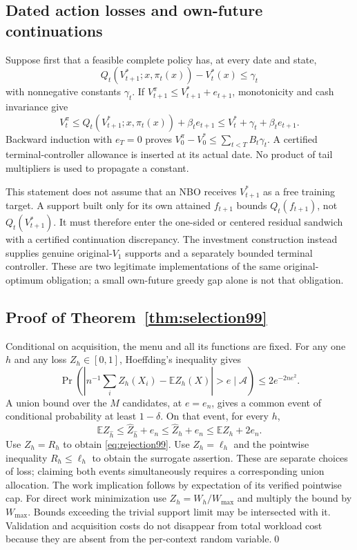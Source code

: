 \subsection{Dated action losses and own-future continuations}
Suppose first that a feasible complete policy has, at every date and state,
\[
 Q_t(V^*_{t+1};x,\pi_t(x))-V_t^*(x)\le\gamma_t
\]
with nonnegative constants $\gamma_t$. If $V^\pi_{t+1}\le V^*_{t+1}+e_{t+1}$, monotonicity and cash invariance give
\[
 V_t^\pi\le Q_t(V^*_{t+1};x,\pi_t(x))+\beta_te_{t+1}
 \le V_t^*+\gamma_t+\beta_te_{t+1}.
\]
Backward induction with $e_T=0$ proves $V_0^\pi-V_0^*\le\sum_{t<T}B_t\gamma_t$. A certified terminal-controller allowance is inserted at its actual date. No product of tail multipliers is used to propagate a constant.

This statement does not assume that an NBO receives $V^*_{t+1}$ as a free training target. A support built only for its own attained $f_{t+1}$ bounds $Q_t(f_{t+1})$, not $Q_t(V^*_{t+1})$. It must therefore enter the one-sided or centered residual sandwich with a certified continuation discrepancy. The investment construction instead supplies genuine original-$V_1$ supports and a separately bounded terminal controller. These are two legitimate implementations of the same original-optimum obligation; a small own-future greedy gap alone is not that obligation.

\subsection{Proof of Theorem~\ref{thm:selection99}}
Conditional on acquisition, the menu and all its functions are fixed. For any one $h$ and any loss $Z_h\in[0,1]$, Hoeffding's inequality gives
\[
 \Pr\left(\left|n^{-1}\sum_iZ_h(X_i)-\mathbb EZ_h(X)\right|>e\mid\mathcal A\right)
 \le2e^{-2ne^2}.
\]
A union bound over the $M$ candidates, at $e=e_n$, gives a common event of conditional probability at least $1-\delta$. On that event, for every $h$,
\[
 \mathbb E Z_{\widehat h}
 \le\widehat Z_{\widehat h}+e_n
 \le\widehat Z_h+e_n
 \le\mathbb E Z_h+2e_n.
\]
Use $Z_h=R_h$ to obtain \eqref{eq:rejection99}. Use $Z_h=\ell_h$ and the pointwise inequality $R_h\le\ell_h$ to obtain the surrogate assertion. These are separate choices of loss; claiming both events simultaneously requires a corresponding union allocation. The work implication follows by expectation of its verified pointwise cap. For direct work minimization use $Z_h=W_h/W_{\max}$ and multiply the bound by $W_{\max}$. Bounds exceeding the trivial support limit may be intersected with it. Validation and acquisition costs do not disappear from total workload cost because they are absent from the per-context random variable.\qed

